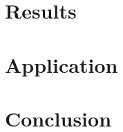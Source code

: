 \documentclass[preprint,12pt]{elsarticle}
\begin{document}
\section{Results}
\label{sec:results}

\section{Application}

\section{Conclusion}
\label{sec:conclusion}





% 









\end{document}

